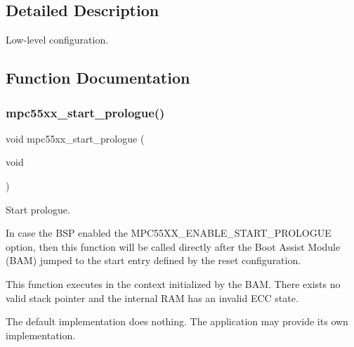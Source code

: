 \subsection{Detailed Description}
Low-\/level configuration. 



\subsection{Function Documentation}
\mbox{\label{mpc55xx-config_8h_a7e6c6f6f004eadf1f5e8606cab9ec22e}} 
\subsubsection{\texorpdfstring{mpc55xx\_start\_prologue()}{mpc55xx\_start\_prologue()}}
{\footnotesize\ttfamily void mpc55xx\+\_\+start\+\_\+prologue (\begin{DoxyParamCaption}\item[{void}]{ }\end{DoxyParamCaption})}



Start prologue. 

In case the B\+SP enabled the M\+P\+C55\+X\+X\+\_\+\+E\+N\+A\+B\+L\+E\+\_\+\+S\+T\+A\+R\+T\+\_\+\+P\+R\+O\+L\+O\+G\+UE option, then this function will be called directly after the Boot Assist Module (B\+AM) jumped to the start entry defined by the reset configuration.

This function executes in the context initialized by the B\+AM. There exists no valid stack pointer and the internal R\+AM has an invalid E\+CC state.

The default implementation does nothing. The application may provide its own implementation. 